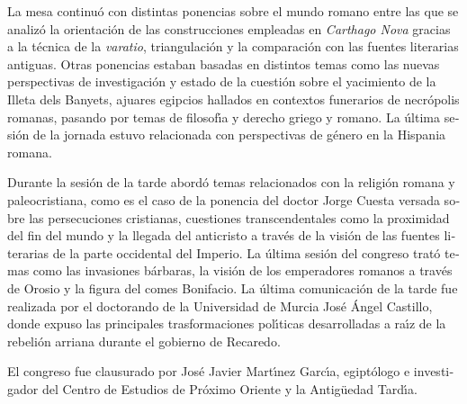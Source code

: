 \documentclass[spanish]{ijsra}
\begin{document}
\begin{otherlanguage}{spanish}
La mesa continu\'{o} con distintas ponencias sobre el mundo romano entre las que se analiz\'{o} la orientaci\'{o}n de las construcciones empleadas en \textit{Carthago Nova} gracias a la t\'{e}cnica de la \textit{varatio}, triangulaci\'{o}n y la comparaci\'{o}n con las fuentes literarias antiguas. Otras ponencias estaban basadas en distintos temas como las nuevas perspectivas de investigaci\'{o}n y estado de la cuesti\'{o}n sobre el yacimiento de la Illeta dels Banyets, ajuares egipcios hallados en contextos funerarios de necr\'{o}polis romanas, pasando por temas de filosof\'{\i}a y derecho griego y romano. La \'{u}ltima sesi\'{o}n de la jornada estuvo relacionada con perspectivas de g\'{e}nero en la Hispania romana. 

Durante la sesi\'{o}n de la tarde abord\'{o} temas relacionados con la religi\'{o}n romana y paleocristiana, como es el caso de la ponencia del doctor Jorge Cuesta versada sobre las persecuciones cristianas, cuestiones transcendentales como la proximidad del fin del mundo y la llegada del anticristo a trav\'{e}s de la visi\'{o}n de las fuentes literarias de la parte occidental del Imperio. 
La \'{u}ltima sesi\'{o}n del congreso trat\'{o} temas como las invasiones b\'{a}rbaras, la visi\'{o}n de los emperadores romanos a trav\'{e}s de Orosio y la figura del comes Bonifacio. La \'{u}ltima comunicaci\'{o}n de la tarde fue realizada por el doctorando de la Universidad de Murcia Jos\'{e} \'{A}ngel Castillo, donde expuso las principales trasformaciones pol\'{\i}ticas desarrolladas a ra\'{\i}z de la rebeli\'{o}n arriana durante el gobierno de Recaredo. 

El congreso fue clausurado por Jos\'{e} Javier Mart\'{\i}nez Garc\'{\i}a, egipt\'{o}logo e investigador del Centro de Estudios de Pr\'{o}ximo Oriente y la Antig\"{u}edad Tard\'{\i}a.  





\IJSRAclosing
\end{otherlanguage}
\end{document}
